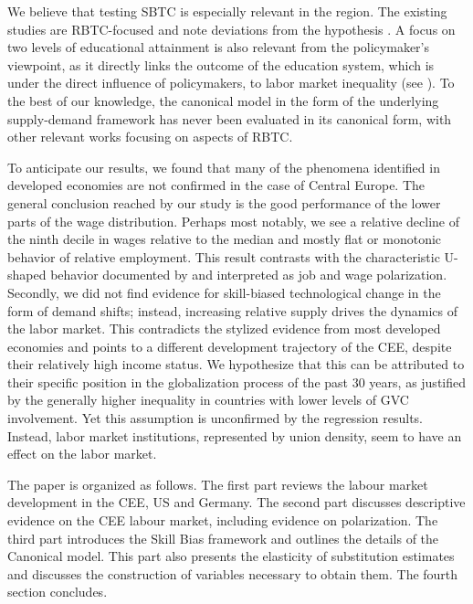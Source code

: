 \documentclass[11pt]{article}
\begin{document}
We believe that testing SBTC is especially relevant in the region. The existing studies are RBTC-focused and note deviations from the hypothesis \citep{arendt2019technical, hardy2018educational}. A focus on two levels of educational attainment is also relevant from the policymaker's viewpoint, as it directly links the outcome of the education system, which is under the direct influence of policymakers, to labor market inequality (see \citep{goldin2010race}). To the best of our knowledge, the canonical model in the form of the underlying supply-demand framework has never been evaluated in its canonical form, with other relevant works focusing on aspects of RBTC.

To anticipate our results, we found that many of the phenomena identified in developed economies are not confirmed in the case of Central Europe. The general conclusion reached by our study is the good performance of the lower parts of the wage distribution. Perhaps most notably, we see a relative decline of the ninth decile in wages relative to the median and mostly flat or monotonic behavior of relative employment. This result contrasts with the characteristic U-shaped behavior documented by \citet{acemoglu2012does} and interpreted as job and wage polarization. Secondly, we did not find evidence for skill-biased technological change in the form of demand shifts; instead, increasing relative supply drives the dynamics of the labor market. This contradicts the stylized evidence from most developed economies and points to a different development trajectory of the CEE, despite their relatively high income status. We hypothesize that this can be attributed to their specific position in the globalization process of the past 30 years, as justified by the generally higher inequality in countries with lower levels of GVC involvement. Yet this assumption is unconfirmed by the regression results. Instead, labor market institutions, represented by union density, seem to have an effect on the labor market.


The paper is organized as follows. The first part reviews the labour market development in the CEE, US and Germany. The second part discusses descriptive evidence on the CEE labour market, including evidence on polarization. The third part introduces the Skill Bias framework and outlines the details of the Canonical model. This part also presents the elasticity of substitution estimates and discusses the construction of variables necessary to obtain them. The fourth section concludes.
\end{document}
